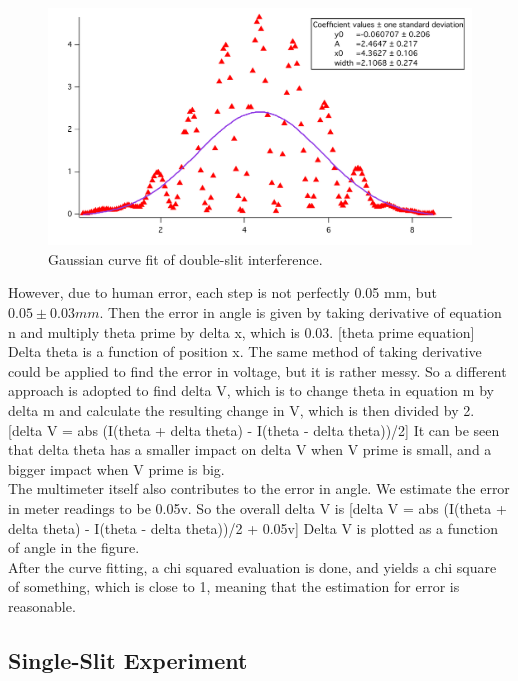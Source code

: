 \documentclass[prb,preprint]{revtex4-1}
\begin{document}
\begin{figure}[h]
\centering
\includegraphics[width=7in]{doublegaus.pdf}
\caption{Gaussian curve fit of double-slit interference.}
\label{gasfit}
\end{figure}

However, due to human error, each step is not perfectly 0.05 mm, but $0.05\pm0.03 mm$.
Then the error in angle is given by taking derivative of equation n and multiply theta prime by delta x, which is 0.03. 
[theta prime equation]
Delta theta is a function of position x. The same method of taking derivative could be applied to find the error in voltage, but it is rather messy. So a different approach is adopted to find delta V, which is to change theta in equation m by delta m and calculate the resulting change in V, which is then divided by 2.
[delta V = abs (I(theta + delta theta) - I(theta - delta theta))/2]
It can be seen that delta theta has a smaller impact on delta V when V prime is small, and a bigger impact when V prime is big.\\

The multimeter itself also contributes to the error in angle. We estimate the error in meter readings to be 0.05v.
So the overall delta V is
[delta V = abs (I(theta + delta theta) - I(theta - delta theta))/2 + 0.05v]
Delta V is plotted as a function of angle in the figure.\\

After the curve fitting, a chi squared evaluation is done, and yields a chi square of something, which is close to 1, meaning that the estimation for error is reasonable. \\





\subsection{Single-Slit Experiment}
\end{document}
